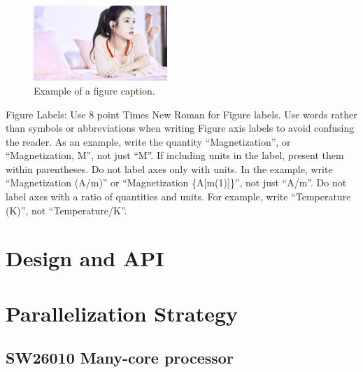 \documentclass[conference]{IEEEtran}
\begin{document}
\begin{figure}[htbp]
\centerline{\includegraphics[width=0.45\textwidth]{fig1.jpg}}
\caption{Example of a figure caption.}
\label{fig}
\end{figure}


Figure Labels: Use 8 point Times New Roman for Figure labels. Use words 
rather than symbols or abbreviations when writing Figure axis labels to 
avoid confusing the reader. As an example, write the quantity 
``Magnetization'', or ``Magnetization, M'', not just ``M''. If including 
units in the label, present them within parentheses. Do not label axes only 
with units. In the example, write ``Magnetization (A/m)'' or ``Magnetization 
\{A[m(1)]\}'', not just ``A/m''. Do not label axes with a ratio of 
quantities and units. For example, write ``Temperature (K)'', not 
``Temperature/K''.

\section{Design and API}

\section{Parallelization Strategy}

\subsection{SW26010 Many-core processor}
\end{document}
